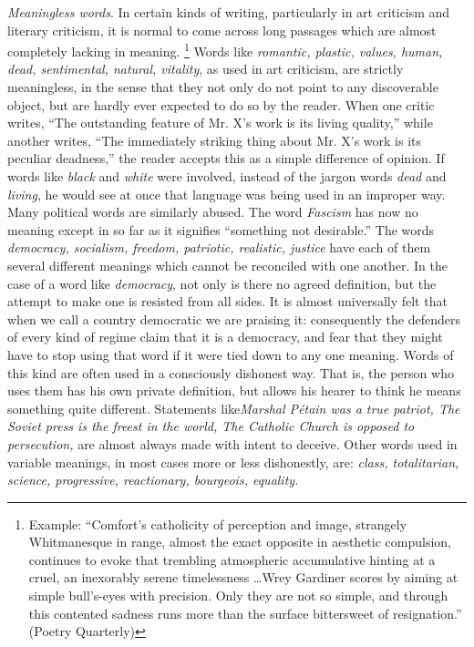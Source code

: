\documentclass[article,twoside,a4paper]{memoir}
\begin{document}
\emph{Meaningless words}. In certain kinds of writing, particularly in art
criticism and literary criticism, it is normal to come across long passages
which are almost completely lacking in meaning.%
\footnote{Example:
``Comfort's catholicity of perception and image, strangely Whitmanesque
in range, almost the exact opposite in aesthetic compulsion, continues to evoke
that trembling atmospheric accumulative hinting at a cruel, an inexorably serene
timelessness \dots Wrey Gardiner scores by aiming at simple bull's-eyes with
precision. Only they are not so simple, and through this contented sadness runs
more than the surface bittersweet of resignation.'' (Poetry Quarterly)}
Words like \emph{romantic,
  plastic, values, human, dead, sentimental, natural, vitality}, as used in
art criticism, are strictly meaningless, in the sense that they not
only do not point to any discoverable object, but are
hardly ever expected to do so by the reader. When one critic writes, ``The
outstanding feature of Mr. X's work is its living quality,'' while another
writes, ``The immediately striking thing about Mr. X's work is its peculiar
deadness,'' the reader accepts this as a simple difference of opinion. If
words like \emph{black} and \emph{white} were involved, instead of the jargon
words \emph{dead} and \emph{living}, he would see at once that language was
being used in an improper way. Many political words are similarly abused. The
word \emph{Fascism} has now no meaning except in so far as it signifies ``something
not desirable.'' The words \emph{democracy, socialism, freedom, patriotic,
  realistic, justice} have each of them several different meanings which cannot
be reconciled with one another. In the case of a word like \emph{democracy},
not only is there no agreed definition, but the attempt to make one is resisted
from all sides. It is almost universally felt that when we call a country democratic
we are praising it: consequently the defenders of every kind of regime claim
that it is a democracy, and fear that they might have to stop using that word
if it were tied down to any one meaning. Words of this kind are often used in
a consciously dishonest way. That is, the person who uses them has his own private
definition, but allows his hearer to think he means something quite different.
Statements like\emph{Marshal Pétain was a true patriot, The Soviet press
  is the freest in the world, The Catholic Church is opposed to persecution,}
are almost always made with intent to deceive. Other words used in variable
meanings, in most cases more or less dishonestly, are: \emph{class, totalitarian,
  science, progressive, reactionary, bourgeois, equality.}
\end{document}
